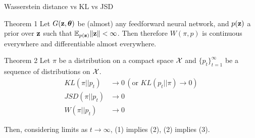 \begin{frame}{Wasserstein distance vs KL vs JSD}
	\begin{block}{Theorem 1}
		Let $G(\mathbf{z}, \boldsymbol{\theta})$ be (almost) any feedforward neural network, and $p(\mathbf{z})$ a prior over $\mathbf{z}$ such that $\mathbb{E}_{p(\mathbf{z})} \|\mathbf{z}\| < \infty$. Then therefore $W(\pi, p)$ is continuous everywhere and differentiable almost everywhere.
	\end{block}
	\begin{block}{Theorem 2}
		Let $\pi$ be a distribution on a compact space $\mathcal{X}$ and $\{p_t\}_{t=1}^\infty$ be a sequence of distributions on $\mathcal{X}$. 
		\begin{align}
			KL(\pi || p_t) &\rightarrow 0 \, (\text{or }KL (p_t || \pi) \rightarrow 0) \\
			JSD(\pi || p_t) &\rightarrow 0 \\
			W(\pi || p_t) &\rightarrow 0
		\end{align}
		
		Then, considering limits as $t \rightarrow \infty$, (1) implies (2), (2) implies (3).
	\end{block}
\end{frame}
